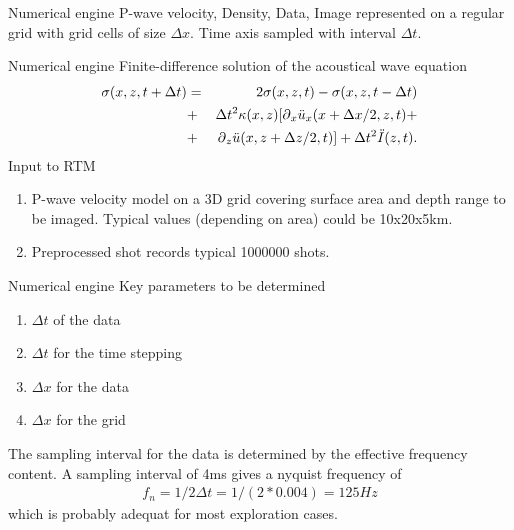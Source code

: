 \documentclass[xcolor=dvipsnames,notes]{beamer}
\begin{document}
\begin{frame}{Numerical engine}
P-wave velocity, Density, Data, Image represented on 
a regular grid with grid cells of size $\Delta x$.
Time axis sampled with interval $\Delta t$.

\vspace{0.5cm}
\end{frame}
\begin{frame}{Numerical engine}
%
Finite-difference solution of the acoustical wave equation
\begin{eqnarray}
    \sigma(x,z,t+\Delta t)           & = &2\sigma(x,z,t) - \sigma(x,z,t-\Delta t) \nonumber\\
                       & + &\Delta t^2{\kappa(x,z)}[\mbox{$\partial$}_{x} \ddot{u}_x(x+\Delta x/2,z,t)+ \nonumber \\
                       &  + &\mbox{$\partial$}_{z} \ddot{u}(x,z+\Delta z/2,t)]
                         + \Delta t^2 \ddot{I}(z,t).\nonumber\\
                                                       \label{eq:ch4-506}
\end{eqnarray}
Input to RTM
\begin{enumerate}
  \item P-wave velocity model on a 3D grid covering surface area and depth range to be imaged.
        Typical values (depending on area) could be 10x20x5km. 
  \item Preprocessed shot records typical 1000000 shots.
\end{enumerate}  
%
\end{frame}
\begin{frame}{Numerical engine}
Key parameters to be determined
\begin{enumerate}
  \item $\Delta t$ of the data
  \item $\Delta t$ for the time stepping
  \item $\Delta x$ for the data
  \item $\Delta x$ for the grid
\end{enumerate}
The sampling interval for the data is determined by the effective frequency content.
A sampling interval of 4ms gives a nyquist frequency of
\begin{eqnarray}
f_n = 1/2\Delta t = 1/(2*0.004) = 125Hz
\end{eqnarray}
which is probably adequat for most exploration cases.
\end{frame}
\end{document}

